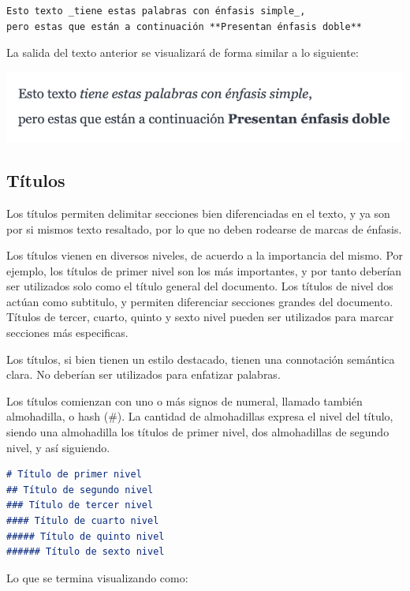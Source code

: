 \begin{lstlisting}[language=Markdown]
Esto texto _tiene estas palabras con énfasis simple_,
pero estas que están a continuación **Presentan énfasis doble**
\end{lstlisting}

La salida del texto anterior se visualizará de forma similar
a lo siguiente:

\includegraphics[]{anexos/markdown/imagenes/md_enfasis.png}

\subsection*{Títulos}

Los títulos permiten delimitar secciones bien diferenciadas en el texto,
y ya son por si mismos texto resaltado, por lo que no deben rodearse de
marcas de énfasis.

Los títulos vienen en diversos niveles, de acuerdo a la importancia del
mismo. Por ejemplo, los títulos de primer nivel son los más importantes,
y por tanto deberían ser utilizados solo como el título general del documento.
Los títulos de nivel dos actúan como subtitulo, y permiten diferenciar
secciones grandes del documento. Títulos de tercer, cuarto, quinto y sexto
nivel pueden ser utilizados para marcar secciones más especificas.

Los títulos, si bien tienen un estilo destacado, tienen una connotación
semántica clara. No deberían ser utilizados para enfatizar palabras.

Los títulos comienzan con uno o más signos de numeral, llamado también
almohadilla, o hash (\#). La cantidad de almohadillas expresa el nivel
del título, siendo una almohadilla los títulos de primer nivel, dos almohadillas
de segundo nivel, y así siguiendo.

\begin{lstlisting}[language=Markdown]
# Título de primer nivel
## Título de segundo nivel
### Título de tercer nivel
#### Título de cuarto nivel
##### Título de quinto nivel
###### Título de sexto nivel
\end{lstlisting}

Lo que se termina visualizando como:

